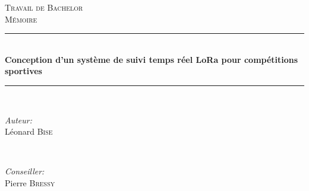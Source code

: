 \begin{titlepage}

\newcommand{\HRule}{\rule{\linewidth}{0.5mm}} %

\center %
 


\vspace{3cm}

\textsc{\Large Travail de Bachelor}\\[0.5cm] %
\textsc{\large Mémoire}\\[0.5cm] %


\HRule \\[0.4cm]
{ \huge \bfseries Conception d'un système de suivi temps réel LoRa pour compétitions sportives}\\[0.4cm] %
\HRule \\[1.5cm]
 

\begin{minipage}{0.4\textwidth}
\begin{flushleft} \large
\emph{Auteur:}\\
Léonard \textsc{Bise} %
\end{flushleft}
\end{minipage}
~
\begin{minipage}{0.4\textwidth}
\begin{flushright} \large
\emph{Conseiller:} \\
Pierre \textsc{Bressy} %
\end{flushright}
\end{minipage}\\[2cm]


\end{titlepage}
